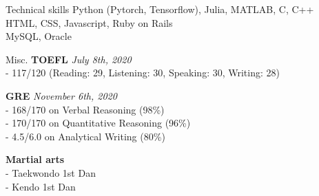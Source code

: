 \documentclass{resume} %
\begin{document}

\begin{rSection}{Technical skills}
Python (Pytorch, Tensorflow), Julia, MATLAB, C, C++  \\
HTML, CSS, Javascript, Ruby on Rails\\
MySQL, Oracle
\end{rSection}


\begin{rSection}{Misc.}
\textbf{TOEFL}
\hfill {\em July 8th, 2020}
\\- 117/120 (Reading: 29, Listening: 30, Speaking: 30, Writing: 28)

\textbf{GRE}
\hfill {\em November 6th, 2020}
\\- 168/170 on Verbal Reasoning (98\%)
\\- 170/170 on Quantitative Reasoning (96\%)
\\- 4.5/6.0 on Analytical Writing (80\%)

\textbf{Martial arts}
\\- Taekwondo 1st Dan
\\- Kendo 1st Dan

\end{rSection}
\end{document}
